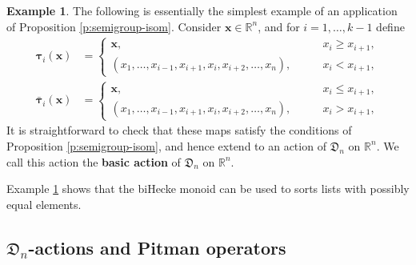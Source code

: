\documentclass[11pt]{article}
\newcommand{\R}{\mathbb{R}}
\newcommand{\bx}{\mathbf{x}}
\theoremstyle{definition} %
\newtheorem{example}[theorem]{Example}
\theoremstyle{remark} %
\newcommand{\btau}{{\boldsymbol \tau}}
\newcommand{\bbtau}{\bar {\boldsymbol \tau}}
\begin{document}
\begin{example}	
	\label{E:basic-action}
	The following is essentially the simplest example of an application of Proposition \ref{p:semigroup-isom}. Consider $\bx \in \R^n$, and for $i = 1, \dots, k-1$ define
	\begin{align*}
		\btau_i(\bx) &= \begin{cases}
			\bx, \qquad & x_i \ge x_{i+1}, \\
			(x_1, \dots, x_{i-1},  x_{i+1}, x_i, x_{i+2},\dots, x_n), \qquad &x_i < x_{i+1},
		\end{cases} \\
		\bbtau_i(\bx) &= \begin{cases}
			\bx, \qquad & x_i \le x_{i+1}, \\
			(x_1, \dots, x_{i-1},  x_{i+1}, x_i, x_{i+2},\dots, x_n), \qquad &x_i > x_{i+1},
		\end{cases}
	\end{align*}
	It is straightforward to check that these maps satisfy the conditions of Proposition \ref{p:semigroup-isom}, and hence extend to an action of $\mathfrak{D}_n$ on $\R^n$. We call this action the \textbf{basic action} of $\mathfrak{D}_n$ on $\R^n$.
\end{example}
Example \ref{E:basic-action} shows that the biHecke monoid can be used to sorts lists with possibly equal elements.

\subsection{\texorpdfstring{$\mathfrak{D}_n$}{}-actions and Pitman operators}
\label{S:Dn-RSK}
\end{document}
